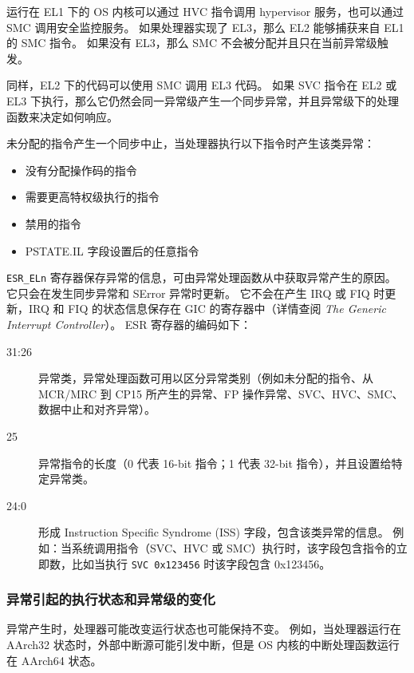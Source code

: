 运行在 EL1 下的 OS 内核可以通过 HVC 指令调用 hypervisor 服务，也可以通过 SMC 调用安全监控服务。
如果处理器实现了 EL3，那么 EL2 能够捕获来自 EL1 的 SMC 指令。
如果没有 EL3，那么 SMC 不会被分配并且只在当前异常级触发。

同样，EL2 下的代码可以使用 SMC 调用 EL3 代码。
如果 SVC 指令在 EL2 或 EL3 下执行，那么它仍然会同一异常级产生一个同步异常，并且异常级下的处理函数来决定如何响应。


未分配的指令产生一个同步中止，当处理器执行以下指令时产生该类异常：

\begin{itemize}
  \item 没有分配操作码的指令
  \item 需要更高特权级执行的指令
  \item 禁用的指令
  \item PSTATE.IL 字段设置后的任意指令
\end{itemize}


\lstinline!ESR_ELn! 寄存器保存异常的信息，可由异常处理函数从中获取异常产生的原因。
它只会在发生同步异常和 SError 异常时更新。
它不会在产生 IRQ 或 FIQ 时更新，IRQ 和 FIQ 的状态信息保存在 GIC 的寄存器中（详情查阅 \textit{The Generic Interrupt Controller}）。 
ESR 寄存器的编码如下：

\begin{description}
  \item[31:26] 异常类，异常处理函数可用以区分异常类别（例如未分配的指令、从 MCR/MRC 到 CP15 所产生的异常、FP 操作异常、SVC、HVC、SMC、数据中止和对齐异常）。
  \item[25] 异常指令的长度（0 代表 16-bit 指令；1 代表 32-bit 指令），并且设置给特定异常类。
  \item[24:0] 形成 Instruction Specific Syndrome (ISS) 字段，包含该类异常的信息。
    例如：当系统调用指令（SVC、HVC 或 SMC）执行时，该字段包含指令的立即数，比如当执行 \lstinline!SVC 0x123456! 时该字段包含 0x123456。
\end{description}

\subsubsection{异常引起的执行状态和异常级的变化}

异常产生时，处理器可能改变运行状态也可能保持不变。
例如，当处理器运行在 AArch32 状态时，外部中断源可能引发中断，但是 OS 内核的中断处理函数运行在 AArch64 状态。


